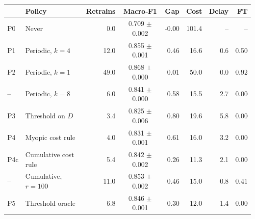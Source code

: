 \begin{tabular}{@{}llrcrrrr@{}}
\toprule
 & Policy & Retrains & Macro-F1 & Gap & Cost & Delay & FT \\
\midrule
P0 & Never & 0.0 & 0.709 $\pm$ 0.002 & -0.00 & 101.4 & -- & -- \\
P1 & Periodic, $k{=}4$ & 12.0 & 0.855 $\pm$ 0.001 & 0.46 & 16.6 & 0.6 & 0.50 \\
P2 & Periodic, $k{=}1$ & 49.0 & 0.868 $\pm$ 0.000 & 0.01 & 50.0 & 0.0 & 0.92 \\
-- & Periodic, $k{=}8$ & 6.0 & 0.841 $\pm$ 0.000 & 0.58 & 15.5 & 2.7 & 0.00 \\
P3 & Threshold on $D$ & 3.4 & 0.825 $\pm$ 0.006 & 0.80 & 19.6 & 5.8 & 0.00 \\
P4 & Myopic cost rule & 4.0 & 0.831 $\pm$ 0.001 & 0.61 & 16.0 & 3.2 & 0.00 \\
P4c & Cumulative cost rule & 5.4 & 0.842 $\pm$ 0.002 & 0.26 & 11.3 & 2.1 & 0.00 \\
-- & Cumulative, $r{=}100$ & 11.0 & 0.853 $\pm$ 0.002 & 0.46 & 15.0 & 0.8 & 0.41 \\
P5 & Threshold oracle & 6.8 & 0.846 $\pm$ 0.001 & 0.30 & 12.0 & 1.4 & 0.00 \\
\bottomrule
\end{tabular}
